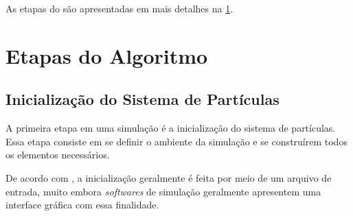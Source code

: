 As etapas do \DEM{} são apresentadas em mais detalhes na \cref{sec:algorithm_steps}.

\section{Etapas do Algoritmo} \label{sec:algorithm_steps}
\subsection{Inicialização do Sistema de Partículas}

A primeira etapa em uma simulação \DEM{} é a inicialização do sistema de partículas. Essa etapa consiste em se definir o ambiente da simulação e se construírem todos os elementos necessários.

De acordo com , a inicialização geralmente é feita por meio de um arquivo de entrada, muito embora \textit{softwares} de simulação geralmente apresentem uma interface gráfica com essa finalidade. 

